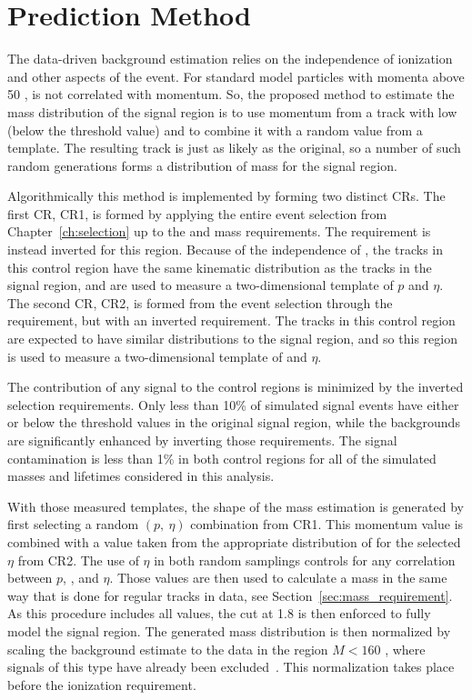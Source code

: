 
\section{Prediction Method}

The data-driven background estimation relies on the independence of ionization and other aspects of the event.
For standard model particles with momenta above 50 \GeV, \dedx is not correlated with momentum.
So, the proposed method to estimate the mass distribution of the signal region is to use momentum from a track with low \dedx (below the threshold value) and to combine it with a random \dedx value from a \dedx template.
The resulting track is just as likely as the original, so a number of such random generations forms a distribution of mass for the signal region.

Algorithmically this method is implemented by forming two distinct \acp{CR}.
The first \ac{CR}, CR1, is formed by applying the entire event selection from Chapter~\ref{ch:selection} up to the \dedx and mass requirements.
The \dedx requirement is instead inverted for this region.
Because of the independence of \dedx, the tracks in this control region have the same kinematic distribution as the tracks in the signal region, and are used to measure a two-dimensional template of $p$ and $\eta$. 
The second \ac{CR}, CR2, is formed from the event selection through the \dedx requirement, but with an inverted \met requirement.
The tracks in this control region are expected to have similar \dedx distributions to the signal region, and so this region is used to measure a two-dimensional template of \dedx and $\eta$. 

The contribution of any signal to the control regions is minimized by the inverted selection requirements.
Only less than 10\% of simulated signal events have either \dedx or \met below the threshold values in the original signal region, while the backgrounds are significantly enhanced by inverting those requirements.
The signal contamination is less than 1\% in both control regions for all of the simulated masses and lifetimes considered in this analysis.

With those measured templates, the shape of the mass estimation is generated by first selecting a random $(p,\ \eta)$ combination from CR1. 
This momentum value is combined with a \dedx value taken from the appropriate distribution of \dedx for the selected $\eta$ from CR2. 
The use of $\eta$ in both random samplings controls for any correlation between $p$, \dedx, and $\eta$. 
Those values are then used to calculate a mass in the same way that is done for regular tracks in data, see Section~\ref{sec:mass_requirement}.
As this procedure includes all \dedx values, the cut at 1.8 \MeVgcm is then enforced to fully model the signal region.
The generated mass distribution is then normalized by scaling the background estimate to the data in the region $M < 160$ \GeV, where signals of this type have already been excluded~\cite{SUSY-2014-09}.
This normalization takes place before the ionization requirement.

